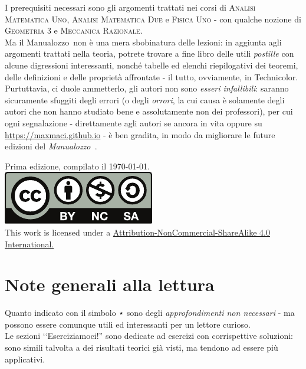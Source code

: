 I prerequisiti necessari sono gli argomenti trattati nei corsi di \textsc{Analisi Matematica Uno}, \textsc{Analisi Matematica Due} e \textsc{Fisica Uno} - con qualche nozione di \textsc{Geometria 3} e \textsc{Meccanica Razionale}.\\
Ma il Manualozzo\texttrademark\ non è una mera sbobinatura delle lezioni: in aggiunta agli argomenti trattati nella teoria, potrete trovare a fine libro delle utili \textit{postille} con alcune digressioni interessanti, nonché tabelle ed elenchi riepilogativi dei teoremi, delle definizioni e delle proprietà affrontate - il tutto, ovviamente, in Technicolor\texttrademark. %
Purtuttavia, ci duole ammetterlo, gli autori non sono \textit{esseri infallibili}: saranno sicuramente sfuggiti degli errori (o degli \textit{orrori}, la cui causa è solamente degli autori che non hanno studiato bene e assolutamente non dei professori), per cui ogni segnalazione - direttamente agli autori se ancora in vita oppure su \textcolor{redill}{\url{https://maxmaci.github.io}} - è ben gradita, in modo da migliorare le future edizioni del \textit{Manualozzo\texttrademark\ }.
\newpage
\thispagestyle{empty}
~\vfill
\begin{center}
	Prima edizione, compilato il \today.\\
			\includegraphics[trim=0cm 0cm 0cm 0cm,clip,scale=0.5]{images/Cc-by-nc-sa_icon.pdf}\\
	{\footnotesize This work is licensed under a \href{https://creativecommons.org/licenses/by-sa/4.0/}{Attribution-NonCommercial-ShareAlike 4.0 International.}}
\end{center}
\newpage
\section*{Note generali alla lettura}
Quanto indicato con il simbolo ⋆ sono degli \textit{approfondimenti non necessari} - ma possono essere comunque utili ed interessanti per un lettore curioso.\\
Le sezioni ‘‘Eserciziamoci!'' sono dedicate ad esercizi con corrispettive soluzioni: sono simili talvolta a dei risultati teorici già visti, ma tendono ad essere più applicativi.
